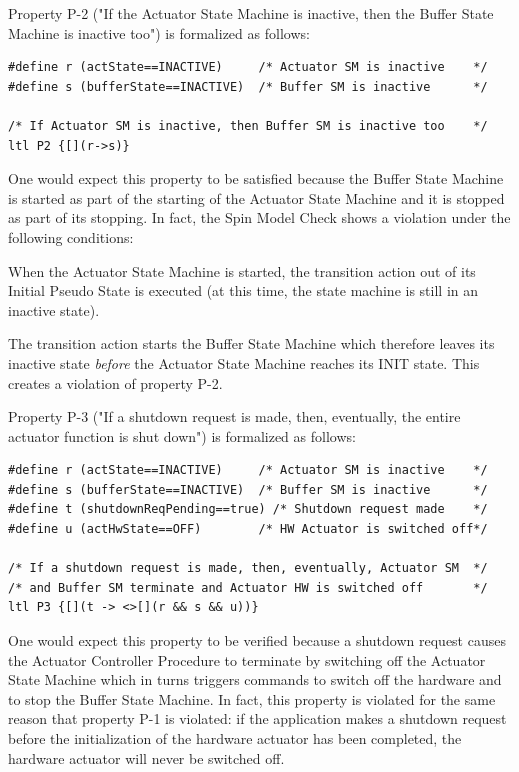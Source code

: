 \documentclass[a4paper,10pt]{article}
\newenvironment{fw_itemize}						%
{\begin{itemize}
  \setlength{\itemsep}{1mm}
  \setlength{\parskip}{0pt}
  \setlength{\parsep}{0pt}}
{\end{itemize}}
\begin{document}
Property P-2 ("If the Actuator State Machine is inactive, then the Buffer State Machine is inactive too") is formalized as follows:

\begin{lstlisting}
#define r (actState==INACTIVE)     /* Actuator SM is inactive    */
#define s (bufferState==INACTIVE)  /* Buffer SM is inactive      */

/* If Actuator SM is inactive, then Buffer SM is inactive too    */
ltl P2 {[](r->s)}
\end{lstlisting}

One would expect this property to be satisfied because the Buffer State Machine is started as part of the starting of the Actuator State Machine and it is stopped as part of its stopping. In fact, the Spin Model Check shows a violation under the following conditions:

\begin{fw_itemize}
\item When the Actuator State Machine is started, the transition action out of its Initial Pseudo State is executed (at this time, the state machine is still in an inactive state).
\item The transition action starts the Buffer State Machine which therefore leaves its inactive state \textit{before} the Actuator State Machine reaches its INIT state. This creates a violation of property P-2.
\end{fw_itemize}

Property P-3 ("If a shutdown request is made, then, eventually, the entire actuator function is shut down") is formalized as follows:

\begin{lstlisting}
#define r (actState==INACTIVE)     /* Actuator SM is inactive    */
#define s (bufferState==INACTIVE)  /* Buffer SM is inactive      */
#define t (shutdownReqPending==true) /* Shutdown request made    */
#define u (actHwState==OFF)        /* HW Actuator is switched off*/

/* If a shutdown request is made, then, eventually, Actuator SM  */
/* and Buffer SM terminate and Actuator HW is switched off       */
ltl P3 {[](t -> <>[](r && s && u))}
\end{lstlisting}

One would expect this property to be verified because a shutdown request causes the Actuator Controller Procedure to terminate by switching off the Actuator State Machine which in turns triggers commands to switch off the hardware and to stop the Buffer State Machine. In fact, this property is violated for the same reason that property P-1 is violated: if the application makes a shutdown request before the initialization of the hardware actuator has been completed, the hardware actuator will never be switched off.
\end{document}

